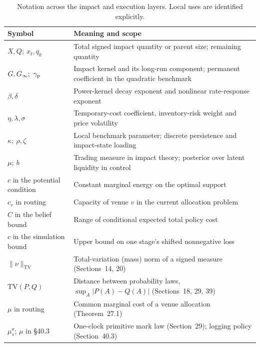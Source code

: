 \documentclass[11pt]{article}
\numberwithin{equation}{section}
\theoremstyle{definition}
\theoremstyle{remark}
\theoremstyle{definition}
\begin{document}
\begin{table}[!htbp]
\centering\small
\caption{Notation across the impact and execution layers. Local uses are identified explicitly.}
\label{tab:notation}
\begin{tabularx}{\textwidth}{p{}Y}
\toprule Symbol & Meaning and scope \\\midrule
$X,Q;\ x_t,q_k$ & Total signed impact quantity or parent size; remaining quantity \\
$G,G_\infty;\ \gamma_{\rm p}$ & Impact kernel and its long-run component; permanent coefficient in the quadratic benchmark \\
$\beta,\delta$ & Power-kernel decay exponent and nonlinear rate-response exponent \\
$\eta,\lambda,\sigma$ & Temporary-cost coefficient, inventory-risk weight and price volatility \\
$\kappa;\ \rho,\zeta$ & Local benchmark parameter; discrete persistence and impact-state loading \\
$\mu;\ b$ & Trading measure in impact theory; posterior over latent liquidity in control \\
$c$ in the potential condition & Constant marginal energy on the optimal support \\
$c_v$ in routing & Capacity of venue $v$ in the current allocation problem \\
$C$ in the belief bound & Range of conditional expected total policy cost \\
$c$ in the simulation bound & Upper bound on one stage's shifted nonnegative loss \\
$\lVert\nu\rVert_{\mathrm{TV}}$ & Total-variation (mass) norm of a signed measure (Sections~14, 20)\\
$\mathrm{TV}(P,Q)$ & Distance between probability laws, $\sup_A\lvert P(A)-Q(A)\rvert$ (Sections~18, 29, 39)\\
$\mu$ in routing & Common marginal cost of a venue allocation (Theorem~27.1)\\
$\mu^a_s$; $\mu$ in \S40.3 & One-clock primitive mark law (Section~29); logging policy (Section~40.3)\\
\bottomrule
\end{tabularx}
\end{table}
\end{document}

